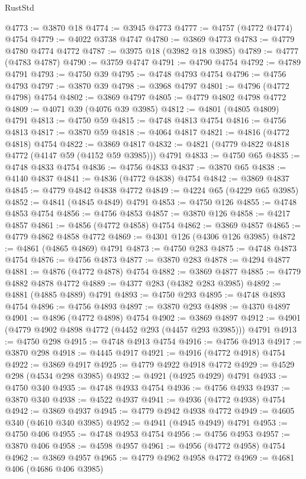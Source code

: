 \begin{lexlean}{RustStd}
\begin{coremodule}
@4773 := @3870 @18
@4774 := @3945 @4773
@4777 := @4757 (@4772 @4774) @4754
@4779 := @4022 @3738 @4747
@4780 := @3869 @4773
@4783 := @4779 @4780 @4774 @4772
@4787 := @3975 @18 (@3982 @18 @3985)
@4789 := @4777 (@4783 @4787)
@4790 := @3759 @4747
@4791 := @4790 @4754
@4792 := @4789 @4791
@4793 := @4750 @39
@4795 := @4748 @4793 @4754
@4796 := @4756 @4793
@4797 := @3870 @39
@4798 := @3968 @4797
@4801 := @4796 (@4772 @4798) @4754
@4802 := @3869 @4797
@4805 := @4779 @4802 @4798 @4772
@4809 := @4071 @39 (@4076 @39 @3985)
@4812 := @4801 (@4805 @4809) @4791
@4813 := @4750 @59
@4815 := @4748 @4813 @4754
@4816 := @4756 @4813
@4817 := @3870 @59
@4818 := @4064 @4817
@4821 := @4816 (@4772 @4818) @4754
@4822 := @3869 @4817
@4832 := @4821 (@4779 @4822 @4818 @4772 (@4147 @59 (@4152 @59 @3985))) @4791
@4833 := @4750 @65
@4835 := @4748 @4833 @4754
@4836 := @4756 @4833
@4837 := @3870 @65
@4838 := @4140 @4837
@4841 := @4836 (@4772 @4838) @4754
@4842 := @3869 @4837
@4845 := @4779 @4842 @4838 @4772
@4849 := @4224 @65 (@4229 @65 @3985)
@4852 := @4841 (@4845 @4849) @4791
@4853 := @4750 @126
@4855 := @4748 @4853 @4754
@4856 := @4756 @4853
@4857 := @3870 @126
@4858 := @4217 @4857
@4861 := @4856 (@4772 @4858) @4754
@4862 := @3869 @4857
@4865 := @4779 @4862 @4858 @4772
@4869 := @4301 @126 (@4306 @126 @3985)
@4872 := @4861 (@4865 @4869) @4791
@4873 := @4750 @283
@4875 := @4748 @4873 @4754
@4876 := @4756 @4873
@4877 := @3870 @283
@4878 := @4294 @4877
@4881 := @4876 (@4772 @4878) @4754
@4882 := @3869 @4877
@4885 := @4779 @4882 @4878 @4772
@4889 := @4377 @283 (@4382 @283 @3985)
@4892 := @4881 (@4885 @4889) @4791
@4893 := @4750 @293
@4895 := @4748 @4893 @4754
@4896 := @4756 @4893
@4897 := @3870 @293
@4898 := @4370 @4897
@4901 := @4896 (@4772 @4898) @4754
@4902 := @3869 @4897
@4912 := @4901 (@4779 @4902 @4898 @4772 (@4452 @293 (@4457 @293 @3985))) @4791
@4913 := @4750 @298
@4915 := @4748 @4913 @4754
@4916 := @4756 @4913
@4917 := @3870 @298
@4918 := @4445 @4917
@4921 := @4916 (@4772 @4918) @4754
@4922 := @3869 @4917
@4925 := @4779 @4922 @4918 @4772
@4929 := @4529 @298 (@4534 @298 @3985)
@4932 := @4921 (@4925 @4929) @4791
@4933 := @4750 @340
@4935 := @4748 @4933 @4754
@4936 := @4756 @4933
@4937 := @3870 @340
@4938 := @4522 @4937
@4941 := @4936 (@4772 @4938) @4754
@4942 := @3869 @4937
@4945 := @4779 @4942 @4938 @4772
@4949 := @4605 @340 (@4610 @340 @3985)
@4952 := @4941 (@4945 @4949) @4791
@4953 := @4750 @406
@4955 := @4748 @4953 @4754
@4956 := @4756 @4953
@4957 := @3870 @406
@4958 := @4598 @4957
@4961 := @4956 (@4772 @4958) @4754
@4962 := @3869 @4957
@4965 := @4779 @4962 @4958 @4772
@4969 := @4681 @406 (@4686 @406 @3985)

\end{coremodule}
\end{lexlean}
